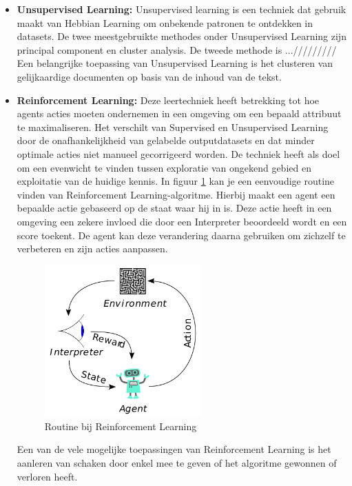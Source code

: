 \begin{itemize}
			\item \textbf{Unsupervised Learning:} Unsupervised learning is een techniek dat gebruik maakt van Hebbian Learning om onbekende patronen te ontdekken in datasets. De twee meestgebruikte methodes onder Unsupervised Learning zijn principal component en cluster analysis. De tweede methode is .../////////
			Een belangrijke toepassing van Unsupervised Learning is het clusteren van gelijkaardige documenten op basis van de inhoud van de tekst.
			\item \textbf{Reinforcement Learning:} Deze leertechniek heeft betrekking tot hoe agents acties moeten ondernemen in een omgeving om een bepaald attribuut te maximaliseren. Het verschilt van Supervised en Unsupervised Learning door de onafhankelijkheid van gelabelde outputdatasets en dat minder optimale acties niet manueel gecorrigeerd worden. De techniek heeft als doel om een evenwicht te vinden tussen exploratie van ongekend gebied en exploitatie van de huidige kennis. In figuur \ref{fig:reinforcemntLearning} kan je een eenvoudige routine vinden van Reinforcement Learning-algoritme. Hierbij maakt een agent een bepaalde actie gebaseerd op de staat waar hij in is. Deze actie heeft in een omgeving een zekere invloed die door een Interpreter beoordeeld wordt en een score toekent. De agent kan deze verandering daarna gebruiken om zichzelf te verbeteren en zijn acties aanpassen. 
			\begin{figure}
				\centering
				\includegraphics[width=60mm]{afbeeldingen/Reinforcement_learning_diagram.PNG}
				\caption{Routine bij Reinforcement Learning}
				\label{fig:reinforcemntLearning}
			\end{figure}
			Een van de vele mogelijke toepassingen van Reinforcement Learning is het aanleren van schaken door enkel mee te geven of het algoritme gewonnen of verloren heeft. 

		\end{itemize}

